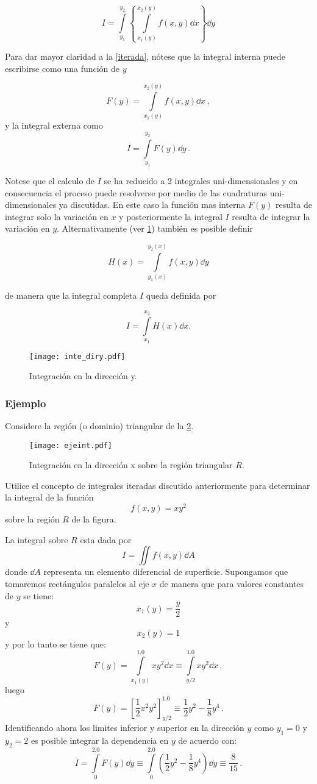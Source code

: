 \begin{equation}
  I = \int\limits_{y_1}^{y_2} \left\{ \int\limits_{x_1(y)}^{x_2(y)} f(x,y) \dd{x}  \right\} \dd{y}
  \label{iterada}
\end{equation}


Para dar mayor claridad a la \cref{iterada}, nótese que la integral interna puede escribirse como una función de $y$

\[F(y) = \int\limits_{x_1(y)}^{x_2(y)} f(x,y) \dd{x}\, , \]
y la integral externa como
\[I = \int\limits_{y_1}^{y_2} F(y) \dd{y}\, . \]

Notese que el calculo de $I$ se ha reducido a 2 integrales uni-dimensionales y en consecuencia el proceso puede resolverse por medio de las cuadraturas uni-dimensionales ya discutidas. En este caso la función mas interna $F(y)$ resulta de integrar solo la variación en $x$ y posteriormente la integral $I$ resulta de integrar la variación en $y$. Alternativamente (ver \cref{fig:diry}) también es posible definir

\[H(x) = \int\limits_{y_1(x)}^{y_2(x)} f(x,y) \dd{y} \]

de manera que la integral completa $I$ queda definida por

\[I = \int\limits_{x_1}^{x_2} H(x) \dd{x}. \]

\begin{figure}[H]
\centering
\texttt{[image: inte\_diry.pdf]}
\caption{Integración en la dirección y.}
\label{fig:diry}
\end{figure}


\subsubsection*{Ejemplo}

Considere la región (o dominio) triangular de la \cref{fig:ejeint}.
\begin{figure}[h]
	\centering
	\texttt{[image: ejeint.pdf]}
	\caption{Integración en la dirección x sobre la región triangular $R$.}
	\label{fig:ejeint}
\end{figure}

Utilice el concepto de integrales iteradas discutido anteriormente para 
determinar la integral de la función
\[f(x,y)=x y^2\]
sobre la región $R$ de la figura.

La integral sobre $R$ esta dada por
\[I = \iint f(x,y) \dd{A}\]
donde $\dd{A}$ representa un elemento diferencial de superficie. Supongamos que 
tomaremos rectángulos paralelos al eje $x$ de manera que para valores 
constantes de $y$ se tiene:
\[x_1(y) = \frac{y}{2}\]
y
\[x_2(y) = 1\]
y por lo tanto se tiene que:
\[F(y) = \int\limits_{x_1(y)}^{1.0} x y^2 \dd{x}  \equiv \int\limits_{y/2}^{1.0} x y^2 \dd{x}\, , \]
luego
\[F(y) = \left[ \frac{1}{2} x^2 y^2 \right]_{y/2}^{1.0} \equiv \frac{1}{2} y^2 
- \frac{1}{8}  y^4\, .\]
Identificando ahora los limites inferior y superior en la dirección $y$ como 
${y_1} = 0$ y ${y_2} = 2$ es posible integrar la dependencia en $y$ de acuerdo 
con:
\[I = \int\limits_0^{2.0} F(y) \dd{y}  \equiv \int\limits_0^{2.0} 
\left(\frac{1}{2}y^2 - \frac{1}{8} y^4\right) \dd{y}  \equiv \frac{8}{15}\, .\]


